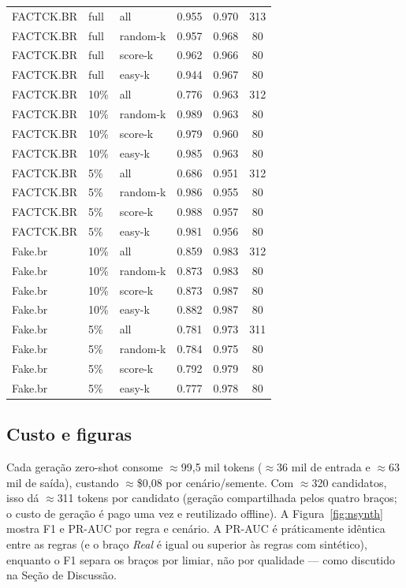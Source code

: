\documentclass[conference]{IEEEtran}
\begin{document}
\begin{table}[t]
\begin{tabular}{@{}lllccc@{}}
FACTCK.BR & full & all & 0.955 & 0.970 & 313 \\
FACTCK.BR & full & random-k & 0.957 & 0.968 & 80 \\
FACTCK.BR & full & score-k & 0.962 & 0.966 & 80 \\
FACTCK.BR & full & easy-k & 0.944 & 0.967 & 80 \\
FACTCK.BR & 10\% & all & 0.776 & 0.963 & 312 \\
FACTCK.BR & 10\% & random-k & 0.989 & 0.963 & 80 \\
FACTCK.BR & 10\% & score-k & 0.979 & 0.960 & 80 \\
FACTCK.BR & 10\% & easy-k & 0.985 & 0.963 & 80 \\
FACTCK.BR & 5\% & all & 0.686 & 0.951 & 312 \\
FACTCK.BR & 5\% & random-k & 0.986 & 0.955 & 80 \\
FACTCK.BR & 5\% & score-k & 0.988 & 0.957 & 80 \\
FACTCK.BR & 5\% & easy-k & 0.981 & 0.956 & 80 \\
Fake.br & 10\% & all & 0.859 & 0.983 & 312 \\
Fake.br & 10\% & random-k & 0.873 & 0.983 & 80 \\
Fake.br & 10\% & score-k & 0.873 & 0.987 & 80 \\
Fake.br & 10\% & easy-k & 0.882 & 0.987 & 80 \\
Fake.br & 5\% & all & 0.781 & 0.973 & 311 \\
Fake.br & 5\% & random-k & 0.784 & 0.975 & 80 \\
Fake.br & 5\% & score-k & 0.792 & 0.979 & 80 \\
Fake.br & 5\% & easy-k & 0.777 & 0.978 & 80 \\
\bottomrule
\end{tabular}
\end{table}

\subsection{Custo e figuras}

Cada gera\c{c}\~ao zero-shot consome $\approx$99{,}5 mil tokens ($\approx$36 mil de entrada e $\approx$63 mil de sa\'ida), custando $\approx$\$0{,}08 por cen\'ario/semente. Com $\approx$320 candidatos, isso d\'a $\approx$311 tokens por candidato (gera\c{c}\~ao compartilhada pelos quatro bra\c{c}os; o custo de gera\c{c}\~ao \'e pago uma vez e reutilizado offline). A Figura~\ref{fig:nsynth} mostra F1 e PR-AUC por regra e cen\'ario. A PR-AUC \'e pr\'aticamente id\^entica entre as regras (e o bra\c{c}o \emph{Real} \'e igual ou superior \`as regras com sint\'etico), enquanto o F1 separa os bra\c{c}os por limiar, n\~ao por qualidade --- como discutido na Se\c{c}\~ao de Discuss\~ao.
\end{document}
